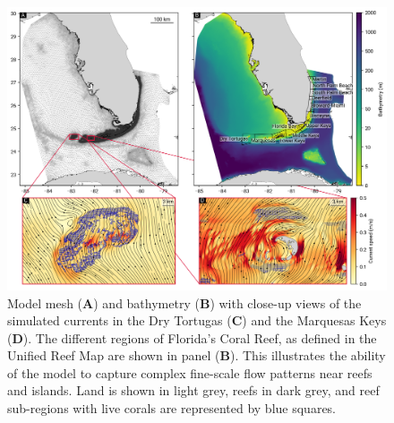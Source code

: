 \documentclass[preprint,12pt,authoryear]{elsarticle}
\begin{document}
	\begin{figure}
		\centering
		\includegraphics[width=\textwidth]{figures/fig_mesh_tnc.png}
		\caption{Model mesh (\textbf{A}) and bathymetry (\textbf{B}) with close-up views of the simulated currents in the Dry Tortugas (\textbf{C}) and the Marquesas Keys (\textbf{D}). The different regions of Florida's Coral Reef, as defined in the Unified Reef Map are shown in panel (\textbf{B}). This illustrates the ability of the model to capture complex fine-scale flow patterns near reefs and islands. Land is shown in light grey, reefs in dark grey, and reef sub-regions with live corals are represented by blue squares.}
		\label{fig:mesh}
	\end{figure}
\end{document}
